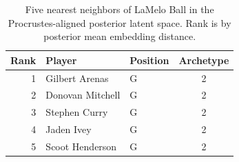 \begin{table}[htbp]
  \centering\small
  \begin{tabular}{rllc}
    \toprule
    Rank & Player & Position & Archetype \\
    \midrule
    1 & Gilbert Arenas & G & 2 \\
    2 & Donovan Mitchell & G & 2 \\
    3 & Stephen Curry & G & 2 \\
    4 & Jaden Ivey & G & 2 \\
    5 & Scoot Henderson & G & 2 \\
    \bottomrule
  \end{tabular}
  \caption{Five nearest neighbors of LaMelo Ball in the Procrustes-aligned posterior latent space. Rank is by posterior mean embedding distance.}
  \label{tab:LaMelo_Ball_neighbors}
\end{table}

